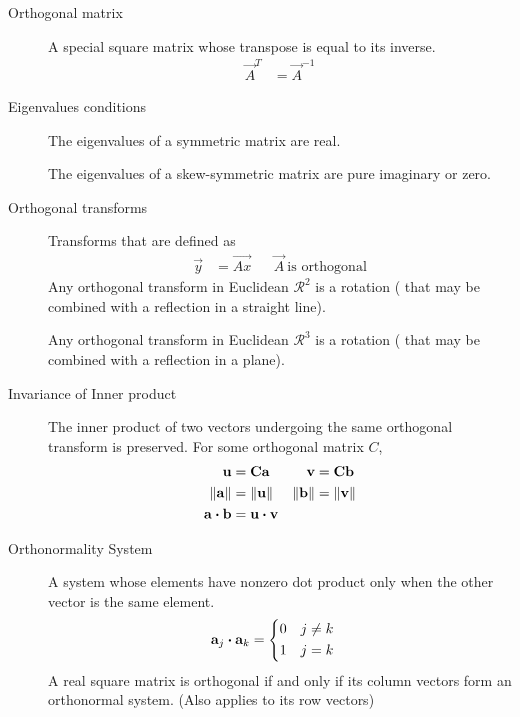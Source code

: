 \begin{description}
    \item[Orthogonal matrix] A special square matrix whose transpose is equal to its
        inverse.
        \begin{align}
            \vec{A}^T & = \vec{A}^{-1}
        \end{align}

    \item[Eigenvalues conditions] The eigenvalues of a symmetric matrix are real. \par
        The eigenvalues of a skew-symmetric matrix are pure imaginary or zero.

    \item[Orthogonal transforms] Transforms that are defined as
        \begin{align}
            \vec{y} & = \vec{Ax} &  & \vec{A}\ \text{is orthogonal}
        \end{align}
        Any orthogonal transform in Euclidean $ \mathcal{R}^2 $ is a rotation ( that may
        be combined with a reflection in a straight line). \par
        Any orthogonal transform in Euclidean $ \mathcal{R}^3 $ is a rotation ( that may
        be combined with a reflection in a plane).

    \item[Invariance of Inner product] The inner product of two vectors undergoing the
        same orthogonal transform is preserved. For some orthogonal matrix $ C $,
        \begin{align}
            \mathbf{u}               & = \mathbf{Ca}              & \mathbf{v} & = \mathbf{Cb} \\
            \lVert \mathbf{a} \rVert & =\lVert \mathbf{u} \rVert  &
            \lVert \mathbf{b} \rVert & =\lVert \mathbf{v} \rVert                         \\
            \mathbf{a} \boldsymbol{\cdot} \mathbf{b} & = \mathbf{u} \boldsymbol{\cdot} \mathbf{v}
        \end{align}

    \item[Orthonormality System] A system whose elements have nonzero dot product
        only when the other vector is the same element.
        \begin{align}
            \mathbf{a}_j \boldsymbol{\cdot} \mathbf{a}_k & = \begin{dcases}
                                              0 & j \neq k \\
                                              1 & j = k
                                          \end{dcases}
        \end{align}
        A real square matrix is orthogonal if and only if its column vectors form
        an orthonormal system. (Also applies to its row vectors)


\end{description}
